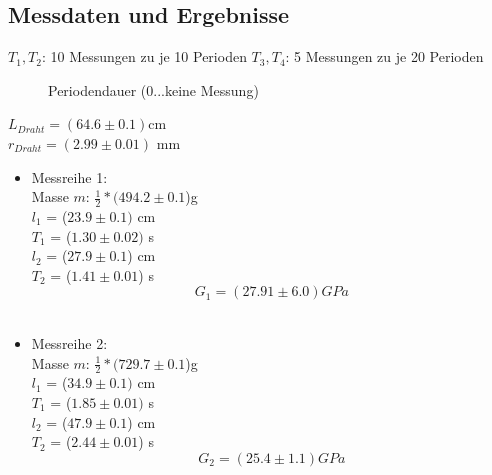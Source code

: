 \documentclass[12pt,a4paper]{article}
\begin{document}
\begin{multicols}{2}
\subsection{Messdaten und Ergebnisse}



$T_1, T_2$: 10 Messungen zu je 10 Perioden
$T_3, T_4$:   5 Messungen zu je 20 Perioden
\begin{figure}[H]
	\centering
	\caption{Periodendauer (0...keine Messung)}
	\label{fig:torsion_mw}
\end{figure}
\noindent
$L_{Draht} = (64.6 \pm 0.1)$cm\\
$r_{Draht} = (2.99 \pm 0.01)$ mm\\

\begin{itemize}
	\item Messreihe 1:\\
	Masse $m$: $\frac{1}{2}*(494.2 \pm 0.1$)g\\
	$l_1$ =   ($23.9 \pm 0.1)$ cm\\
	$T_1$ = ($1.30 \pm 0.02)$ s\\
	$l_2$  =  ($27.9 \pm 0.1$) cm\\
	$T_2$ = ($1.41 \pm 0.01$) s\\
	$$ G_1 = ( 27.91\pm 6.0)GPa$$\\
	
	
	\item Messreihe 2:\\
	Masse $m$: $\frac{1}{2}*(729.7 \pm 0.1$)g\\
	$l_1$ =   ($34.9 \pm 0.1)$ cm\\
	$T_1$ = ($1.85 \pm 0.01)$ s\\
	$l_2$  =  ($47.9 \pm 0.1$) cm\\
	$T_2$ = ($2.44 \pm 0.01$) s\\
	$$ G_2 = (25.4 \pm 1.1 )GPa$$\\
\end{itemize}


\end{multicols}
\end{document}
